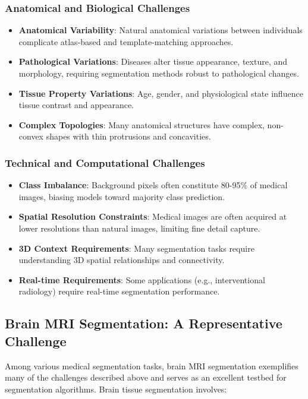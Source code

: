 \documentclass[12pt,a4paper]{article}
\begin{document}
\subsubsection{Anatomical and Biological Challenges}
\begin{itemize}
    \item \textbf{Anatomical Variability}: Natural anatomical variations between individuals complicate atlas-based and template-matching approaches.
    \item \textbf{Pathological Variations}: Diseases alter tissue appearance, texture, and morphology, requiring segmentation methods robust to pathological changes.
    \item \textbf{Tissue Property Variations}: Age, gender, and physiological state influence tissue contrast and appearance.
    \item \textbf{Complex Topologies}: Many anatomical structures have complex, non-convex shapes with thin protrusions and concavities.
\end{itemize}

\subsubsection{Technical and Computational Challenges}
\begin{itemize}
    \item \textbf{Class Imbalance}: Background pixels often constitute 80-95\% of medical images, biasing models toward majority class prediction.
    \item \textbf{Spatial Resolution Constraints}: Medical images are often acquired at lower resolutions than natural images, limiting fine detail capture.
    \item \textbf{3D Context Requirements}: Many segmentation tasks require understanding 3D spatial relationships and connectivity.
    \item \textbf{Real-time Requirements}: Some applications (e.g., interventional radiology) require real-time segmentation performance.
\end{itemize}

\subsection{Brain MRI Segmentation: A Representative Challenge}

Among various medical segmentation tasks, brain MRI segmentation exemplifies many of the challenges described above and serves as an excellent testbed for segmentation algorithms. Brain tissue segmentation involves:
\end{document}
